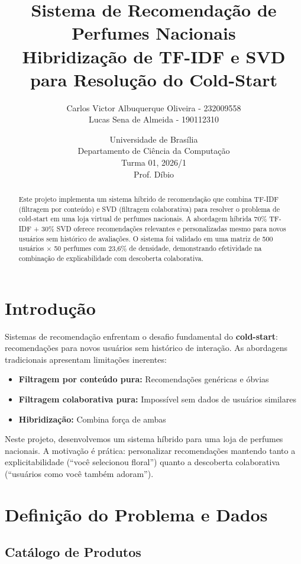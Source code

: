 \documentclass[12pt,a4paper]{article}
\title{\textbf{Sistema de Recomendação de Perfumes Nacionais} \\ 
       \large Hibridização de TF-IDF e SVD para Resolução do Cold-Start}
\author{Carlos Victor Albuquerque Oliveira - 232009558 \\ Lucas Sena de Almeida - 190112310}
\date{Universidade de Brasília \\ Departamento de Ciência da Computação \\ Turma 01, 2026/1 \\ Prof. Díbio}
\begin{document}
\maketitle

\begin{abstract}
Este projeto implementa um sistema híbrido de recomendação que combina TF-IDF (filtragem por conteúdo) e SVD (filtragem colaborativa) para resolver o problema de cold-start em uma loja virtual de perfumes nacionais. A abordagem híbrida 70\% TF-IDF + 30\% SVD oferece recomendações relevantes e personalizadas mesmo para novos usuários sem histórico de avaliações. O sistema foi validado em uma matriz de 500 usuários × 50 perfumes com 23,6\% de densidade, demonstrando efetividade na combinação de explicabilidade com descoberta colaborativa.
\end{abstract}

\section{Introdução}

Sistemas de recomendação enfrentam o desafio fundamental do \textbf{cold-start}: recomendações para novos usuários sem histórico de interação. As abordagens tradicionais apresentam limitações inerentes:

\begin{itemize}
    \item \textbf{Filtragem por conteúdo pura:} Recomendações genéricas e óbvias
    \item \textbf{Filtragem colaborativa pura:} Impossível sem dados de usuários similares
    \item \textbf{Hibridização:} Combina força de ambas
\end{itemize}

Neste projeto, desenvolvemos um sistema híbrido para uma loja de perfumes nacionais. A motivação é prática: personalizar recomendações mantendo tanto a explicitabilidade (``você selecionou floral'') quanto a descoberta colaborativa (``usuários como você também adoram'').

\section{Definição do Problema e Dados}

\subsection{Catálogo de Produtos}
\end{document}
